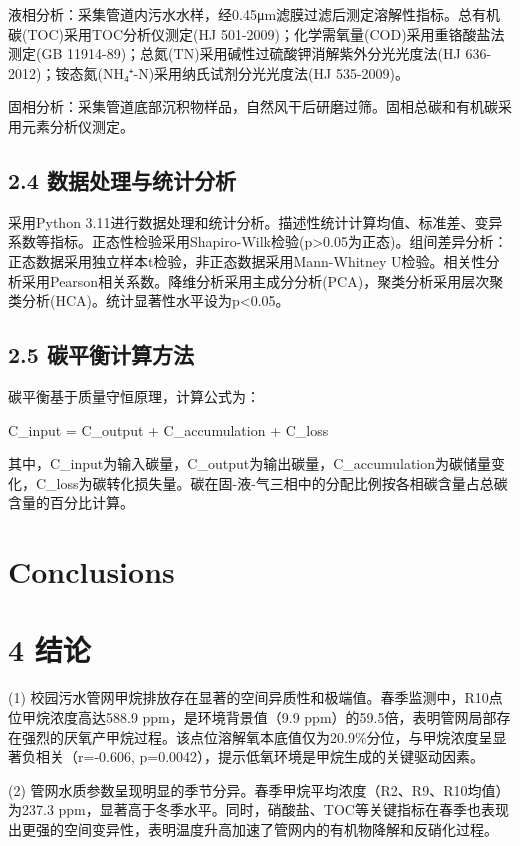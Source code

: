 \documentclass[12pt]{article}
\begin{document}
液相分析：采集管道内污水水样，经0.45μm滤膜过滤后测定溶解性指标。总有机碳(TOC)采用TOC分析仪测定(HJ 501-2009)；化学需氧量(COD)采用重铬酸盐法测定(GB 11914-89)；总氮(TN)采用碱性过硫酸钾消解紫外分光光度法(HJ 636-2012)；铵态氮(NH₄⁺-N)采用纳氏试剂分光光度法(HJ 535-2009)。

固相分析：采集管道底部沉积物样品，自然风干后研磨过筛。固相总碳和有机碳采用元素分析仪测定。

\subsection{2.4 数据处理与统计分析}

采用Python 3.11进行数据处理和统计分析。描述性统计计算均值、标准差、变异系数等指标。正态性检验采用Shapiro-Wilk检验(p>0.05为正态)。组间差异分析：正态数据采用独立样本t检验，非正态数据采用Mann-Whitney U检验。相关性分析采用Pearson相关系数。降维分析采用主成分分析(PCA)，聚类分析采用层次聚类分析(HCA)。统计显著性水平设为p<0.05。

\subsection{2.5 碳平衡计算方法}

碳平衡基于质量守恒原理，计算公式为：

C\_input = C\_output + C\_accumulation + C\_loss

其中，C\_input为输入碳量，C\_output为输出碳量，C\_accumulation为碳储量变化，C\_loss为碳转化损失量。碳在固-液-气三相中的分配比例按各相碳含量占总碳含量的百分比计算。

\section{Conclusions}
\label{sec:conclusion}

\section{4 结论}

(1) 校园污水管网甲烷排放存在显著的空间异质性和极端值。春季监测中，R10点位甲烷浓度高达588.9 ppm，是环境背景值（9.9 ppm）的59.5倍，表明管网局部存在强烈的厌氧产甲烷过程。该点位溶解氧本底值仅为20.9\%分位，与甲烷浓度呈显著负相关（r=-0.606, p=0.0042），提示低氧环境是甲烷生成的关键驱动因素。

(2) 管网水质参数呈现明显的季节分异。春季甲烷平均浓度（R2、R9、R10均值）为237.3 ppm，显著高于冬季水平。同时，硝酸盐、TOC等关键指标在春季也表现出更强的空间变异性，表明温度升高加速了管网内的有机物降解和反硝化过程。
\end{document}
